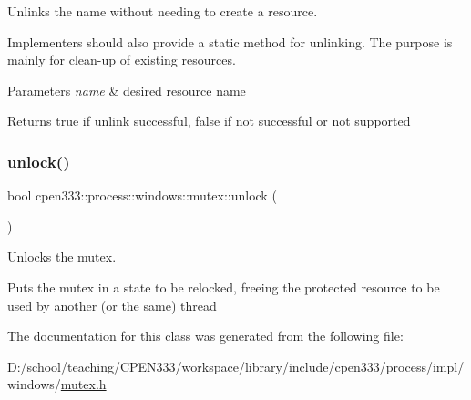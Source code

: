 Unlinks the name without needing to create a resource. 

Implementers should also provide a static method for unlinking. The purpose is mainly for clean-\/up of existing resources.


\begin{DoxyParams}{Parameters}
{\em name} & desired resource name \\
\hline
\end{DoxyParams}
\begin{DoxyReturn}{Returns}
{\ttfamily true} if unlink successful, {\ttfamily false} if not successful or not supported 
\end{DoxyReturn}
\mbox{\label{classcpen333_1_1process_1_1windows_1_1mutex_a998f0f3d2e56d3acf63a30b465e153a7}} 
\subsubsection{\texorpdfstring{unlock()}{unlock()}}
{\footnotesize\ttfamily bool cpen333\+::process\+::windows\+::mutex\+::unlock (\begin{DoxyParamCaption}{ }\end{DoxyParamCaption})\hspace{0.3cm}{\ttfamily [inline]}}



Unlocks the mutex. 

Puts the mutex in a state to be relocked, freeing the protected resource to be used by another (or the same) thread 

The documentation for this class was generated from the following file\+:\begin{DoxyCompactItemize}
\item 
D\+:/school/teaching/\+C\+P\+E\+N333/workspace/library/include/cpen333/process/impl/windows/\hyperlink{impl_2windows_2mutex_8h}{mutex.\+h}\end{DoxyCompactItemize}
